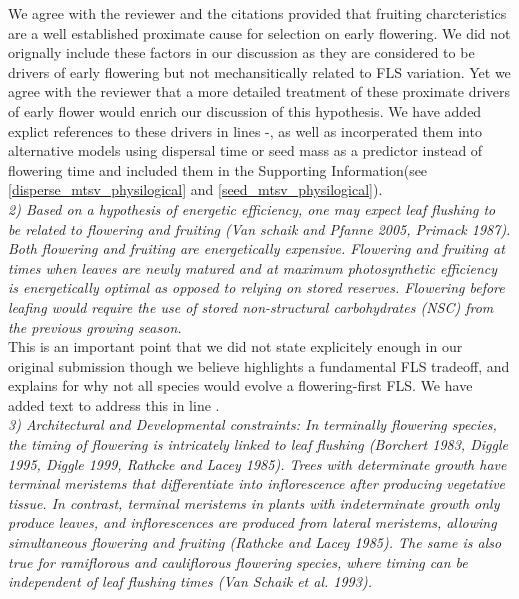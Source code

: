\documentclass{article}[11pt]
\begin{document}
\noindent We agree with the reviewer and the citations provided that fruiting charcteristics are a well established proximate cause for selection on early flowering. We did not orignally include these factors in our discussion as they are considered to be drivers of early flowering but not mechansitically related to FLS variation. Yet we agree with the reviewer that a more detailed treatment of these proximate drivers of early flower would enrich our discussion of this hypothesis. We have added explict references to these drivers in lines -, as well as incorperated them into alternative models using dispersal time or seed mass as a predictor instead of flowering time and included them in the Supporting Information(see \ref{disperse_mtsv_physilogical} and \ref{seed_mtsv_physilogical}).\\

\emph{2) Based on a hypothesis of energetic efficiency, one may expect leaf flushing to be related to flowering and fruiting (Van schaik and Pfanne 2005, Primack 1987). Both flowering and fruiting are energetically expensive. Flowering and fruiting at times when leaves are newly matured and at maximum photosynthetic efficiency is energetically optimal as opposed to relying on stored reserves. Flowering before leafing would require the use of stored non-structural carbohydrates (NSC) from the previous growing season.}\\

\noindent This is an important point that we did not state explicitely enough in our original submission though we believe highlights a fundamental FLS tradeoff, and explains for why not all species would evolve a flowering-first FLS. We have added text to address this in line .\\

\emph{3) Architectural and Developmental constraints: In terminally flowering species, the timing of flowering is intricately linked to leaf flushing (Borchert 1983, Diggle 1995, Diggle 1999, Rathcke and Lacey 1985). Trees with determinate growth have terminal meristems that differentiate into inflorescence after producing vegetative tissue. In contrast, terminal meristems in plants with indeterminate growth only produce leaves, and inflorescences are produced from lateral meristems, allowing simultaneous flowering and fruiting (Rathcke and Lacey 1985). The same is also true for ramiflorous and cauliflorous flowering species, where timing can be independent of leaf flushing times (Van Schaik et al. 1993).}
\end{document}
